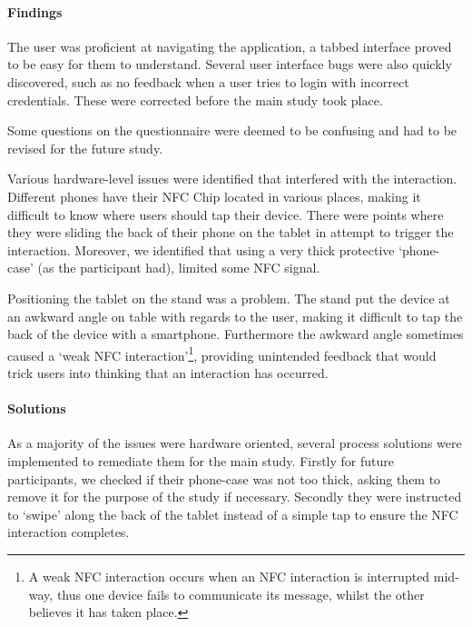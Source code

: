 \paragraph{Findings}

The user was proficient at navigating the application, a tabbed interface proved to be easy for them to understand. Several user interface bugs were also quickly discovered, such as no feedback when a user tries to login with incorrect credentials. These were corrected before the main study took place.

Some questions on the questionnaire were deemed to be confusing and had to be revised for the future study.

Various hardware-level issues were identified that interfered with the interaction. Different phones have their NFC Chip located in various places, making it difficult to know where users should tap their device. There were points where they were sliding the back of their phone on the tablet in attempt to trigger the interaction. Moreover, we identified that using a very thick protective `phone-case' (as the participant had), limited some NFC signal.

Positioning the tablet on the stand was a problem. The stand put the device at an awkward angle on table with regards to the user, making it difficult to tap the back of the device with a smartphone. Furthermore the awkward angle sometimes caused a `weak NFC interaction'\footnote{A weak NFC interaction occurs when an NFC interaction is interrupted mid-way, thus one device fails to communicate its message, whilst the other believes it has taken place.}, providing unintended feedback that would trick users into thinking that an interaction has occurred.

\paragraph{Solutions}
\label{sec:idealsolution}
As a majority of the issues were hardware oriented, several process solutions were implemented to remediate them for the main study. Firstly for future participants, we checked if their phone-case was not too thick, asking them to remove it for the purpose of the study if necessary. Secondly they were instructed to `swipe' along the back of the tablet instead of a simple tap to ensure the NFC interaction completes.

